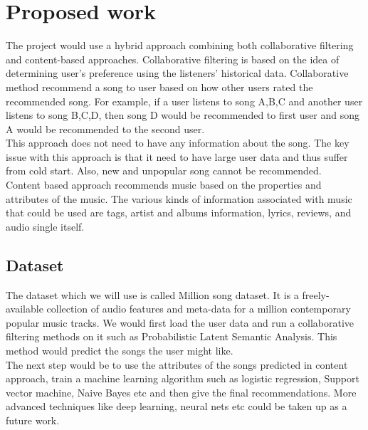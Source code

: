 \documentclass{sig-alternate-05-2015}
\begin{document}
\section{Proposed work}
The project would use a hybrid approach combining both collaborative filtering and content-based approaches. Collaborative filtering is based on the idea of determining user's preference using the listeners' historical data. Collaborative method recommend a song to user based on how other users rated the recommended song. For example, if a user listens to song A,B,C and another user listens to song B,C,D, then song D would be recommended to first user and song A would be recommended to the second user.\\

This approach does not need to have any information about the song. The key issue with this approach is that it need to have large user data and thus suffer from cold start. Also, new and unpopular song cannot be recommended.\\

Content based approach recommends music based on the properties and attributes of the music. The various kinds of information associated with music that could be used are tags, artist and albums information, lyrics, reviews, and audio single itself.

\subsection{Dataset}
The dataset which we will use is called Million song dataset. It is a freely-available collection of audio features and meta-data for a million contemporary popular music tracks. We would first load the user data and run a collaborative filtering methods on it such as Probabilistic Latent Semantic Analysis. This method would predict the songs the user might like.\\

The next step would be to use the attributes of the songs predicted in content approach, train a machine learning algorithm such as logistic regression, Support vector machine, Naive Bayes etc and then give the final recommendations. More advanced techniques like deep learning, neural nets etc could be taken up as a future work.
\end{document}
